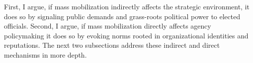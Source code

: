 


First, I argue, if mass mobilization indirectly affects the strategic environment, it does so by signaling public demands and grass-roots political power to elected officials. Second, I argue, if mass mobilization directly affects agency policymaking it does so by evoking norms rooted in organizational identities and reputations. 
The next two subsections address these indirect and direct mechanisms in more depth. 



